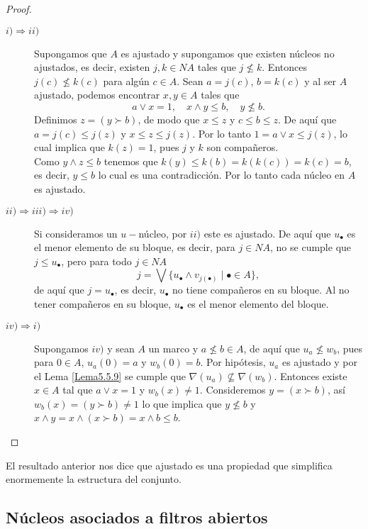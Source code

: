 \begin{proof}
    \begin{description}
        \item[$i)\Rightarrow ii) $] Supongamos que $A$ es ajustado y supongamos que existen núcleos no ajustados, es decir, existen $j, k\in NA$ tales que $j\nleq k$. Entonces $j(c)\nleq k(c)$ para algún $c\in A$. Sean $a=j(c)$, $b=k(c)$ y al ser $A$ ajustado, podemos encontrar $x, y\in A$ tales que 
        \[
        a\vee x=1,\quad x\wedge y\leq b, \quad y\nleq b.
        \]
        Definimos $z=(y\succ b)$, de modo que $x\leq z$ y $c\leq b\leq z$. De aquí que $a=j(c)\leq j(z)$ y $x\leq z\leq j(z)$. Por lo tanto $1=a\vee x\leq j(z)$, lo cual implica que $k(z)=1$, pues $j$ y $k$ son compañeros.\\

        Como $y\wedge z\leq b$ tenemos que $k(y)\leq k(b)=k(k(c))=k(c)=b$, es decir, $y\leq b$ lo cual es una contradicción. Por lo tanto cada núcleo en $A$ es ajustado.

        \item[$ii)\Rightarrow iii)\Rightarrow iv) $] Si consideramos un $u-$núcleo, por $ii)$ este es ajustado. De aquí que $u_\bullet$ es el menor elemento de su bloque, es decir, para $j\in NA$, no se cumple que $j\leq u_\bullet$, pero para todo $j\in NA$
        \[
        j=\bigvee\{u_\bullet\wedge v_{j(\bullet)}\mid \bullet \in A\},
        \]
        de aquí que $j=u_\bullet$, es decir, $u_\bullet$ no tiene compañeros en su bloque. Al no tener compañeros en su bloque, $u_\bullet$ es el menor elemento del bloque.

        \item[$iv)\Rightarrow i) $] Supongamos $iv)$ y sean $A$ un marco y $a\nleq b\in A$, de aquí que $u_a\nleq w_b$, pues para $0\in A$, $u_a(0)=a$ y $w_b(0)=b$. Por hipótesis, $u_a$ es ajustado y por el Lema \ref{Lema5.5.9} se cumple que $\nabla(u_a)\nsubseteq \nabla(w_b)$. Entonces existe $x\in A$ tal que $a\vee x=1$ y $w_b(x)\neq 1$. Consideremos $y=(x\succ b)$, así $w_b(x)=(y\succ b)\neq 1$ lo que implica que $y\nleq b$ y $x\wedge y=x\wedge (x\succ b)=x\wedge b\leq b$.
    \end{description}
\end{proof}

El resultado anterior nos dice que ajustado es una propiedad que simplifica enormemente la estructura del conjunto.

\subsection{Núcleos asociados a filtros abiertos}

